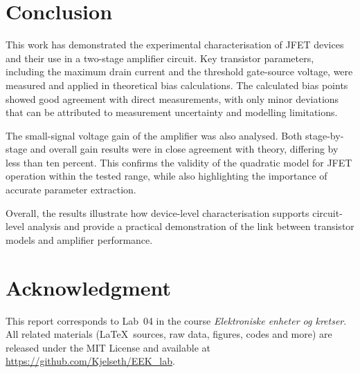\documentclass[conference]{IEEEtran}
\begin{document}
\section{Conclusion}

This work has demonstrated the experimental characterisation of JFET devices and their use in a two-stage amplifier circuit.  
Key transistor parameters, including the maximum drain current and the threshold gate-source voltage, were measured and applied in theoretical bias calculations.  
The calculated bias points showed good agreement with direct measurements, with only minor deviations that can be attributed to measurement uncertainty and modelling limitations.  

The small-signal voltage gain of the amplifier was also analysed.  
Both stage-by-stage and overall gain results were in close agreement with theory, differing by less than ten percent.  
This confirms the validity of the quadratic model for JFET operation within the tested range, while also highlighting the importance of accurate parameter extraction.  

Overall, the results illustrate how device-level characterisation supports circuit-level analysis and provide a practical demonstration of the link between transistor models and amplifier performance.  



\section*{Acknowledgment}
This report corresponds to Lab~04 in the course \emph{Elektroniske enheter og kretser}.
All related materials (\LaTeX~sources, raw data, figures, codes and more) are released under the MIT License and available at \url{https://github.com/Kjelseth/EEK_lab}.
\end{document}
